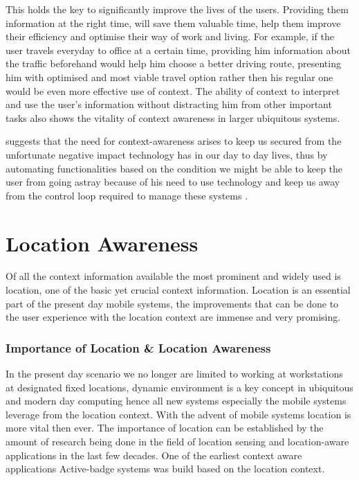 \documentclass[12pt]{report}
\begin{document}
This holds the key to significantly improve the lives of the users. Providing them information at the right time, will save them valuable time, help them improve their efficiency and optimise their way of work and living. For example, if the user travels everyday to office at a certain time, providing him information about the traffic beforehand would help him choose a better driving route, presenting him with optimised and most viable travel option rather then his regular one would be even more effective use of context.  The ability of context to interpret and use the user's information without distracting him from other important tasks also shows the vitality of context awareness in larger ubiquitous systems. 

\cite{moran2001introduction} suggests that the need for context-awareness arises to keep us secured from the unfortunate negative impact technology has in our day to day lives, thus by automating functionalities based on the condition we might be able to keep the user from going astray because of his need to use technology and keep us away from the control loop required to manage these systems \cite{erickson2002some}.

\chapter{Location Awareness}

Of all the context information available the most prominent and widely used is location, one of the basic yet crucial context information. Location is an essential part of the present day mobile systems, the improvements that can be done to the user experience with the location context are immense and very promising.

\subsection{Importance of Location \& Location Awareness}

In the present day scenario we no longer are limited to working at workstations at designated fixed locations, dynamic environment is a key concept in ubiquitous and modern day computing hence all new systems especially the mobile systems leverage from the location context. With the advent of mobile systems location is more vital then ever. The importance of location can be established by the amount of research being done in the field of location sensing and location-aware applications in the last few decades. One of the earliest context aware applications Active-badge systems \cite{want1992active} was build based on the location context.
\end{document}
